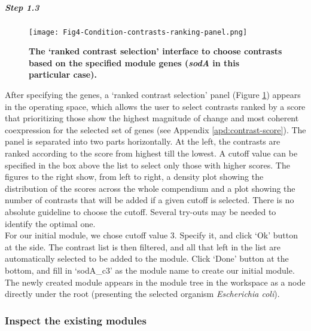 \begin{small}
\subparagraph{Step 1.3}	

\begin{figure}[b]
	\centering
  	\texttt{[image: Fig4-Condition-contrasts-ranking-panel.png]}
	\caption[COLOMBOS contrast ranking interface]{\textbf{The `ranked contrast 
	selection' interface to choose contrasts based on the specified module 
	genes (\textit{sodA} in this particular case).}}
	\label{fig:colombos-ranking}
\end{figure}

After specifying the genes, a `ranked contrast selection' panel (Figure \ref{fig:colombos-ranking}) appears in the operating space, which allows the user to select contrasts ranked by a score that prioritizing those show the highest magnitude of change and most coherent coexpression for the selected set of genes (see Appendix \ref{apd:contrast-score}). The panel is separated into two parts horizontally.  At the left, the contrasts are ranked according to the score from highest till the lowest. A cutoff value can be specified in the box above the list to select only those with higher scores. The figures to the right show, from left to right, a density plot showing the distribution of the scores across the whole compendium and a plot showing the number of contrasts that will be added if a given cutoff is selected.  There is no absolute guideline to choose the cutoff. Several try-outs may be needed to identify the optimal one.
\\
For our initial module, we chose cutoff value 3. Specify it, and click `Ok' button at the side. The contrast list is then filtered, and all that left in the list are automatically selected to be added to the module. Click `Done' button at the bottom, and fill in `sodA\_c3' as the module name to create our initial module.  The newly created module appears in the module tree in the workspace as a node directly under the root (presenting the selected organism \textit{Escherichia coli}).


\end{small} %



\subsubsection{Inspect the existing modules}


